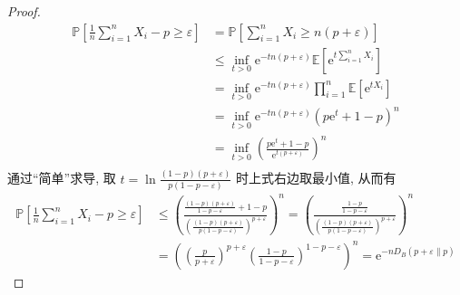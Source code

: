 \documentclass[8pt]{article}
\theoremstyle{compact}
\def\le{\leqslant}
\def\ge{\geqslant}
\def\P#1{\mathbb{P}\left[{#1}\right]}
\def\E#1{\mathbb{E}\left[{#1}\right]}
\def\e{\mathrm{e}}
\begin{document}
\begin{proof}
	\begin{equation*}
		\begin{split}
			\P{\frac1n \sum_{i=1}^{n}X_i - p \ge \varepsilon} &=\P{\sum_{i=1}^{n}X_i \ge n(p + \varepsilon)}\\
			&\le \inf_{t > 0}\e^{-tn(p + \varepsilon)}\E{\e^{t\sum_{i=1}^nX_i}}\\
			&= \inf_{t > 0}\e^{-tn(p + \varepsilon)}\prod_{i=1}^{n}\E{\e^{tX_i}}\\
			&= \inf_{t > 0}\e^{-tn(p + \varepsilon)}(p\e^t + 1 - p)^n\\
			&= \inf_{t > 0}\left(\frac{p\e^t + 1 - p}{\e^{t(p + \varepsilon)}}\right)^n\\
		\end{split}
	\end{equation*}
	通过“简单”求导, 取 $t = \ln\frac{(1 - p)(p + \varepsilon)}{p(1 - p - \varepsilon)}$ 时上式右边取最小值, 从而有
	\begin{equation*}
		\begin{split}
			\P{\frac1n \sum_{i=1}^{n}X_i - p \ge \varepsilon} &\le \left(\frac{\frac{(1-p)(p+\varepsilon)}{1-p-\varepsilon}+1-p}{\left(\frac{(1-p)(p+\varepsilon)}{p(1-p-\varepsilon)}\right)^{p+\varepsilon}}\right)^n = \left(\frac{\frac{1-p}{1-p-\varepsilon}}{\left(\frac{(1-p)(p+\varepsilon)}{p(1-p-\varepsilon)}\right)^{p+\varepsilon}}\right)^n \\&= \left(\left(\frac{p}{p+\varepsilon}\right)^{p+\varepsilon}\left(\frac{1-p}{1-p-\varepsilon}\right)^{1-p-\varepsilon}\right)^n = \e^{-nD_B(p+\varepsilon \| p)}
		\end{split}
	\end{equation*}
\end{proof}
\end{document}
